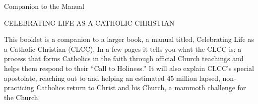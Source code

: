 \documentclass{article}        %
\begin{document}











Companion to the Manual

CELEBRATING LIFE AS A CATHOLIC CHRISTIAN

This booklet is a companion to a larger book, a manual titled, Celebrating Life
as a Catholic Christian (CLCC). In a few pages it tells you what the CLCC is: a
process that forms Catholics in the faith through official Church teachings and
helps them respond to their ``Call to Holiness.'' It will also explain CLCC's
special apostolate, reaching out to and helping an estimated 45 million lapsed,
non-practicing Catholics return to Christ and his Church, a mammoth challenge
for the Church.
\end{document}
